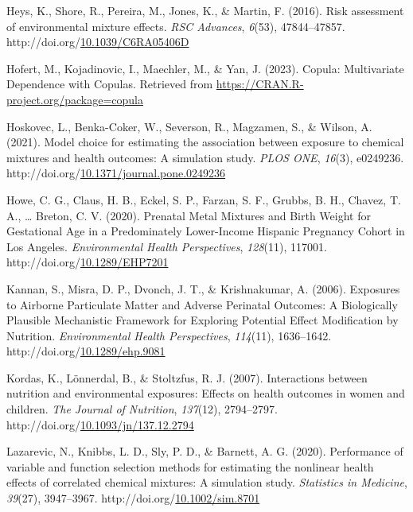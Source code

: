 \documentclass[12pt, twoside]{amherstthesis}
\newenvironment{CSLReferences}[2]%
  {}%
  {\par}
\begin{document}
\begin{CSLReferences}{1}{0}
\leavevmode{}%
Heys, K., Shore, R., Pereira, M., Jones, K., \& Martin, F. (2016). Risk assessment of environmental mixture effects. \emph{RSC Advances}, \emph{6}(53), 47844--47857. http://doi.org/\href{https://doi.org/10.1039/C6RA05406D}{10.1039/C6RA05406D}

\leavevmode{}%
Hofert, M., Kojadinovic, I., Maechler, M., \& Yan, J. (2023). Copula: {Multivariate} {Dependence} with {Copulas}. Retrieved from \url{https://CRAN.R-project.org/package=copula}

\leavevmode{}%
Hoskovec, L., Benka-Coker, W., Severson, R., Magzamen, S., \& Wilson, A. (2021). Model choice for estimating the association between exposure to chemical mixtures and health outcomes: {A} simulation study. \emph{PLOS ONE}, \emph{16}(3), e0249236. http://doi.org/\href{https://doi.org/10.1371/journal.pone.0249236}{10.1371/journal.pone.0249236}

\leavevmode{}%
Howe, C. G., Claus, H. B., Eckel, S. P., Farzan, S. F., Grubbs, B. H., Chavez, T. A., \ldots{} Breton, C. V. (2020). Prenatal {Metal} {Mixtures} and {Birth} {Weight} for {Gestational} {Age} in a {Predominately} {Lower}-{Income} {Hispanic} {Pregnancy} {Cohort} in {Los} {Angeles}. \emph{Environmental Health Perspectives}, \emph{128}(11), 117001. http://doi.org/\href{https://doi.org/10.1289/EHP7201}{10.1289/EHP7201}

\leavevmode{}%
Kannan, S., Misra, D. P., Dvonch, J. T., \& Krishnakumar, A. (2006). Exposures to {Airborne} {Particulate} {Matter} and {Adverse} {Perinatal} {Outcomes}: {A} {Biologically} {Plausible} {Mechanistic} {Framework} for {Exploring} {Potential} {Effect} {Modification} by {Nutrition}. \emph{Environmental Health Perspectives}, \emph{114}(11), 1636--1642. http://doi.org/\href{https://doi.org/10.1289/ehp.9081}{10.1289/ehp.9081}

\leavevmode{}%
Kordas, K., Lönnerdal, B., \& Stoltzfus, R. J. (2007). Interactions between nutrition and environmental exposures: Effects on health outcomes in women and children. \emph{The Journal of Nutrition}, \emph{137}(12), 2794--2797. http://doi.org/\href{https://doi.org/10.1093/jn/137.12.2794}{10.1093/jn/137.12.2794}

\leavevmode{}%
Lazarevic, N., Knibbs, L. D., Sly, P. D., \& Barnett, A. G. (2020). Performance of variable and function selection methods for estimating the nonlinear health effects of correlated chemical mixtures: {A} simulation study. \emph{Statistics in Medicine}, \emph{39}(27), 3947--3967. http://doi.org/\href{https://doi.org/10.1002/sim.8701}{10.1002/sim.8701}


\end{CSLReferences}
\end{document}

